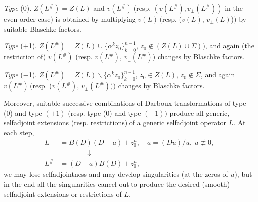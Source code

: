 \documentclass{surv-l}
\theoremstyle{plain}
\theoremstyle{definition}
\numberwithin{equation}{chapter}
\begin{document}
\emph{Type} (0). $Z(L^{\#})=Z(L)$ and $v(L^{\#})$ (resp. $(v(L^{\#}), v_{\pm}(L^{\#}))$ in the even order case) is obtained by multiplying $v(L)\,($resp. ($v(L)$, $v_{\pm}(L)$)$)$ by suitable Blaschke factors.

\emph{Type} (+1). $Z(L^{\#})=Z(L)\cup\{\alpha^{k}z_{0}\}_{k=0}^{n-1}$, $z_{0}\not\in(Z(L)\cup\Sigma))$, and again (the restriction of) $v(L^{\#})$ (resp. $v(L^{\#})$, $v_{\pm}(L^{\#}))$ changes by Blaschke factors.

\emph{Type} ($-$1). $Z(L^{\#})=Z(L)\backslash \{\alpha^{k}z_{0}\}_{k=0}^{n-1}$, $z_{0}\in Z(L)$, $z_{0}\not\in\Sigma$, and again $v(L^{\#})\,($resp. ($v(L^{\#})$, $v_{\pm}(L^{\#})))$ changes by Blaschke factors.

Moreover, suitable successive combinations of Darboux transformations of type (0) and type $(+1)$ (resp. type (0) and type $(-1) )$ produce all generic, selfadjoint extensions (resp. restrictions) of a generic selfadjoint operator $L$. At each step,
\begin{align*}
L &=B(D)(D-a)+z_{0}^{n},\quad a=(Du)/u,\ u\not\equiv 0,\\
&\qquad\quad\quad\downarrow\\
L^{\#}&=(D-a)B(D)+z_{0}^{n},
\end{align*}
we may lose selfadjointness and may develop singularities (at the zeros of $u$), but in the end all the singularities cancel out to produce the desired (smooth) selfadjoint extensions or restrictions of $L$.
\end{document}
